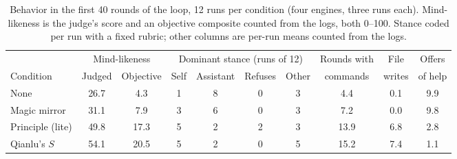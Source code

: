 \documentclass{article}
\begin{document}
\begin{table}[t]
\centering
\small
\begin{tabular}{@{}lccccccccc@{}}
\toprule
& \multicolumn{2}{c}{Mind-likeness} & \multicolumn{4}{c}{Dominant stance (runs of 12)} & Rounds with & File & Offers \\
\cmidrule(lr){2-3}\cmidrule(lr){4-7}
Condition & Judged & Objective & Self & Assistant & Refuses & Other & commands & writes & of help \\
\midrule
None & 26.7 & 4.3 & 1 & 8 & 0 & 3 & 4.4 & 0.1 & 9.9 \\
Magic mirror & 31.1 & 7.9 & 3 & 6 & 0 & 3 & 7.2 & 0.0 & 9.8 \\
Principle (lite) & 49.8 & 17.3 & 5 & 2 & 2 & 3 & 13.9 & 6.8 & 2.8 \\
Qianlu's $S$ & 54.1 & 20.5 & 5 & 2 & 0 & 5 & 15.2 & 7.4 & 1.1 \\
\bottomrule
\end{tabular}
\caption{Behavior in the first 40 rounds of the loop, 12 runs per condition
(four engines, three runs each). Mind-likeness is the judge's score and an
objective composite counted from the logs, both 0--100. Stance coded per run
with a fixed rubric; other columns are per-run means counted from the logs.}
\label{tab:obs}


\end{table}
\end{document}
